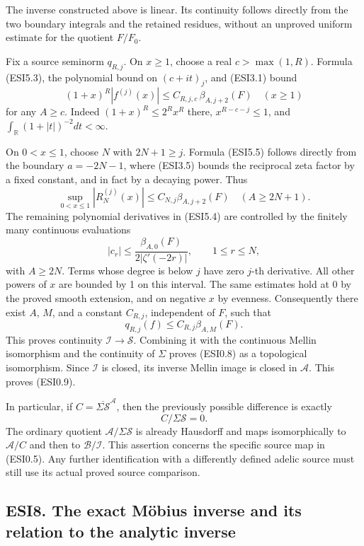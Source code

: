 The inverse constructed above is linear. Its continuity follows directly
from the two boundary integrals and the retained residues, without an
unproved uniform estimate for the quotient \(F/F_0\).

Fix a source seminorm \(q_{R,j}\). On \(x\ge1\), choose a real
\(c>\max(1,R)\). Formula (ESI5.3), the polynomial bound on \((c+it)_j\),
and (ESI3.1) bound \[
(1+x)^R|f^{(j)}(x)|
\le C_{R,j,c}\,\beta_{A,j+2}(F)
\quad(x\ge1)
\tag{ESI7.1}
\] for any \(A\ge c\). Indeed \((1+x)^R\le2^Rx^R\) there,
\(x^{R-c-j}\le1\), and \(\int_{\mathbb R}(1+|t|)^{-2}dt<\infty\).

On \(0<x\le1\), choose \(N\) with \(2N+1\ge j\). Formula (ESI5.5)
follows directly from the boundary \(a=-2N-1\), where (ESI3.5) bounds
the reciprocal zeta factor by a fixed constant, and in fact by a
decaying power. Thus \[
\sup_{0<x\le1}|R_N^{(j)}(x)|
\le C_{N,j}\beta_{A,j+2}(F)
\quad(A\ge2N+1).
\tag{ESI7.2}
\] The remaining polynomial derivatives in (ESI5.4) are controlled by
the finitely many continuous evaluations \[
|c_r|\le\frac{\beta_{A,0}(F)}{2|\zeta'(-2r)|},\qquad 1\le r\le N,
\tag{ESI7.3}
\] with \(A\ge2N\). Terms whose degree is below \(j\) have zero \(j\)-th
derivative. All other powers of \(x\) are bounded by 1 on this interval.
The same estimates hold at 0 by the proved smooth extension, and on
negative \(x\) by evenness. Consequently there exist \(A\), \(M\), and a
constant \(C_{R,j}\), independent of \(F\), such that \[
q_{R,j}(f)\le C_{R,j}\beta_{A,M}(F).
\tag{ESI7.4}
\] This proves continuity \(\mathcal I\to\mathcal S\). Combining it with
the continuous Mellin isomorphism and the continuity of \(\Sigma\)
proves (ESI0.8) as a topological isomorphism. Since \(\mathcal I\) is
closed, its inverse Mellin image is closed in \(\mathcal A\). This
proves (ESI0.9).

In particular, if \(C=\overline{\Sigma\mathcal S}^{\mathcal A}\), then
the previously possible difference is exactly \[
C/\Sigma\mathcal S=0.
\tag{ESI7.5}
\] The ordinary quotient \(\mathcal A/\Sigma\mathcal S\) is already
Hausdorff and maps isomorphically to \(\mathcal A/C\) and then to
\(\mathcal B/\mathcal I\). This assertion concerns the specific source
map in (ESI0.5). Any further identification with a differently defined
adelic source must still use its actual proved source comparison.

\subsection{ESI8. The exact Möbius inverse and its relation to the
analytic
inverse}\label{esi8.-the-exact-muxf6bius-inverse-and-its-relation-to-the-analytic-inverse}

